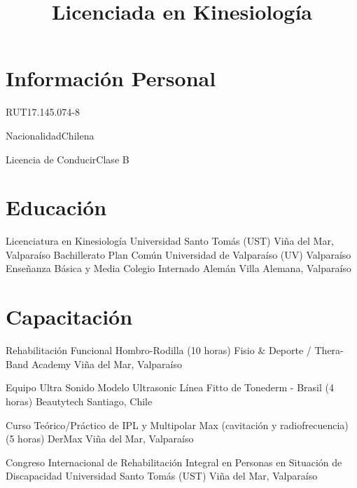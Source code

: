 \documentclass[11pt,a4paper,sans]{moderncv}
\title{Licenciada en Kinesiología}
\begin{document}
\maketitle

\section{Información Personal}

	   {RUT}{17.145.074-8}

	   {Nacionalidad}{Chilena}

	   {Licencia de Conducir}{Clase B}

\section{Educación}

        {Licenciatura en Kinesiología}
        {Universidad Santo Tomás (UST)}
        {Viña del Mar, Valparaíso}
        {}
        {}
        {Bachillerato Plan Común}
        {Universidad de Valparaíso (UV)}
        {Valparaíso}
        {}
        {}
        {Enseñanza Básica y Media}
        {Colegio Internado Alemán}
        {Villa Alemana, Valparaíso}
        {}{}

\section{Capacitación}

        {Rehabilitación Funcional Hombro-Rodilla (10 horas)}
        {Fisio \& Deporte / Thera-Band Academy}
        {Viña del Mar, Valparaíso}
        {}
        {}

        {Equipo Ultra Sonido Modelo Ultrasonic Línea Fitto de Tonederm - Brasil (4 horas)}
        {Beautytech}
        {Santiago, Chile}
        {}
        {}

        {Curso Teórico/Práctico de IPL y Multipolar Max (cavitación y radiofrecuencia) (5 horas)}
        {DerMax}
        {Viña del Mar, Valparaíso}
        {}
        {}

        {Congreso Internacional de Rehabilitación Integral en Personas en Situación de Discapacidad}
        {Universidad Santo Tomás (UST)}
        {Viña del Mar, Valparaíso}
        {}
        {}
\end{document}
